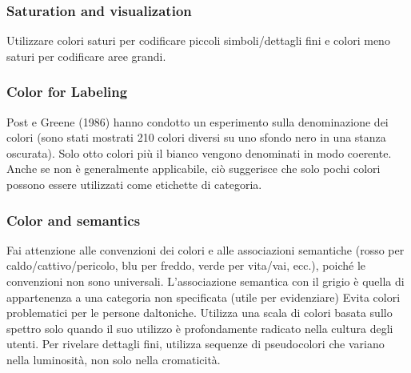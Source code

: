 \subsubsection{Saturation and visualization}
Utilizzare colori saturi per codificare piccoli simboli/dettagli fini e colori meno saturi per codificare aree grandi.
\subsubsection{Color for Labeling}
Post e Greene (1986) hanno condotto un esperimento sulla denominazione dei colori (sono stati mostrati 210 colori diversi su uno sfondo nero in una stanza oscurata). Solo otto colori più il bianco vengono denominati in modo coerente. Anche se non è generalmente applicabile,
ciò suggerisce che solo pochi colori possono essere utilizzati come etichette di categoria.
\subsubsection{Color and semantics}
Fai attenzione alle convenzioni dei colori e alle associazioni semantiche (rosso per caldo/cattivo/pericolo, blu per freddo, verde per vita/vai, ecc.), 
poiché le convenzioni non sono universali. L'associazione semantica con il grigio è quella di appartenenza a una categoria non specificata (utile per evidenziare)
Evita colori problematici per le persone daltoniche.
Utilizza una scala di colori basata sullo spettro solo quando il suo utilizzo è profondamente radicato nella cultura degli utenti.
Per rivelare dettagli fini, utilizza sequenze di pseudocolori che variano nella luminosità, non solo nella cromaticità.
